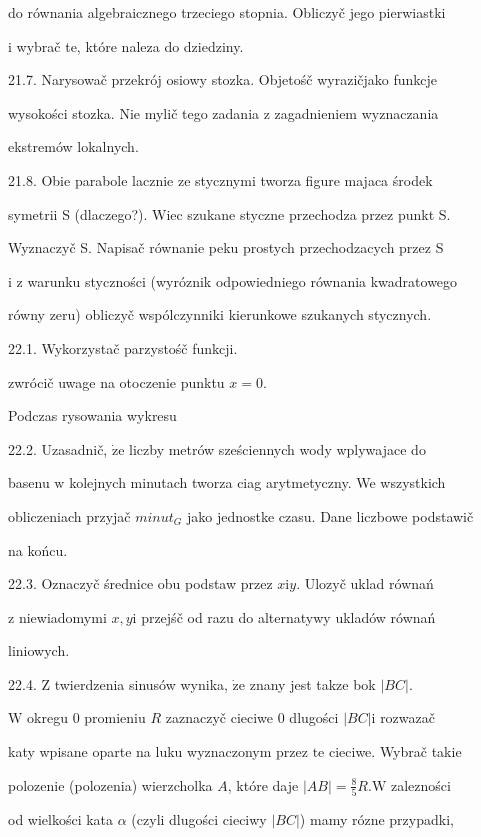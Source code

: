 \documentclass[a4paper,12pt]{article}
\begin{document}
do równania algebraicznego trzeciego stopnia. Obliczyč jego pierwiastki

i wybrač te, które naleza do dziedziny.

21.7. Narysowač przekrój osiowy stozka. Objetośč wyrazičjako funkcje

wysokości stozka. Nie mylič tego zadania z zagadnieniem wyznaczania

ekstremów lokalnych.

21.8. Obie parabole lacznie ze stycznymi tworza figure majaca środek

symetrii S (dlaczego?). Wiec szukane styczne przechodza przez punkt S.

Wyznaczyč S. Napisač równanie peku prostych przechodzacych przez S

i z warunku styczności (wyróznik odpowiedniego równania kwadratowego

równy zeru) obliczyč wspólczynniki kierunkowe szukanych stycznych.

22.1. Wykorzystač parzystośč funkcji.

zwrócič uwage na otoczenie punktu $x=0.$

Podczas rysowania wykresu

22.2. Uzasadnič, $\dot{\mathrm{z}}\mathrm{e}$ liczby metrów sześciennych wody wplywajace do

basenu $\mathrm{w}$ kolejnych minutach tworza ciag arytmetyczny. We wszystkich

obliczeniach przyjač $minut_{G}$ jako jednostke czasu. Dane liczbowe podstawič

na końcu.

22.3. Oznaczyč średnice obu podstaw przez $x\mathrm{i}y$. Ulozyč uklad równań

$\mathrm{z}$ niewiadomymi $x, y \mathrm{i}$ przejśč od razu do alternatywy ukladów równań

liniowych.

22.4. $\mathrm{Z}$ twierdzenia sinusów wynika, $\dot{\mathrm{z}}\mathrm{e}$ znany jest takze bok $|BC|.$

$\mathrm{W}$ okregu $0$ promieniu $R$ zaznaczyč cieciwe $0$ dlugości $|BC| \mathrm{i}$ rozwazač

katy wpisane oparte na luku wyznaczonym przez $\mathrm{t}\mathrm{e}$ cieciwe. Wybrač takie

polozenie (polozenia) wierzcholka $A$, które daje $|AB|=\displaystyle \frac{8}{5}R. \mathrm{W}$ zalezności

od wielkości kata $\alpha$ (czyli dlugości cieciwy $|BC|$) mamy rózne przypadki,
\end{document}
